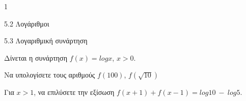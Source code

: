 \begin{ylh}{1}
\item 5.2 Λογάριθμοι
\item 5.3 Λογαριθμική συνάρτηση
\end{ylh}
Δίνεται η συνάρτηση $f(x) = logx$, $x > 0$.
\begin{alist}
\item Να υπολογίσετε τους αριθμούς $f(100)$, $f\left( \sqrt{10} \right)$
\item Για $x > 1$, να επιλύσετε την εξίσωση $f(x + 1) + f(x - 1) = log10\  - \ log5$.
\end{alist}

